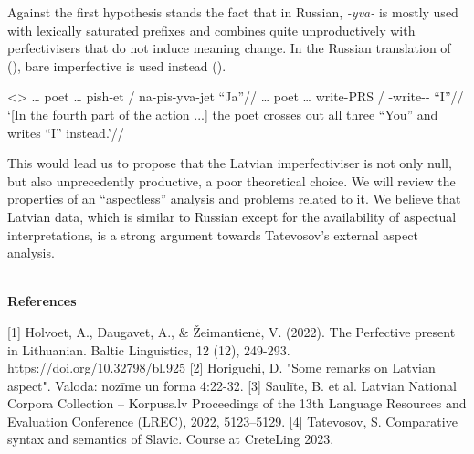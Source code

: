 \documentclass[a4paper, 12pt]{article}
\begin{document}
\begin{sloppypar}
Against the first hypothesis stands the fact that in Russian, \textit{-yva-} is mostly used with lexically saturated prefixes and combines quite unproductively with perfectivisers that do not induce meaning change. In the Russian
translation of (), bare imperfective is used instead (\nextx).

\ex<>
    \begingl
        \gla … poet … pish-et / \ljudge*na-pis-yva-jet “Ja”//
        \glb … poet … write-PRS / \Pfv-write-\Ipfv-\Prs{} “I”//
        \glft ‘[In the fourth part of the action ...] the poet crosses out all three “You” and writes “I” instead.’//
    \endgl
\xe

This would lead us to propose that the Latvian imperfectiviser is not only null, but also
unprecedently productive, a poor theoretical choice. We will review the properties
of an “aspectless” analysis and problems related to it. We believe that Latvian data, which is
similar to Russian except for the availability of aspectual interpretations, is a strong argument
towards Tatevosov’s external aspect analysis.
\\~

\textbf{References}

[1] Holvoet, A., Daugavet, A., \& Žeimantienė, V. (2022). The Perfective present in
Lithuanian. Baltic Linguistics, 12 (12), 249-293. https://doi.org/10.32798/bl.925
[2] Horiguchi, D. "Some remarks on Latvian aspect". Valoda: nozīme un forma 4:22-32.
[3] Saulīte, B. et al. Latvian National Corpora Collection – Korpuss.lv
Proceedings of the 13th Language Resources and Evaluation Conference (LREC), 2022,
5123–5129.
[4] Tatevosov, S. Comparative syntax and semantics of Slavic. Course at CreteLing 2023.

\end{sloppypar}
\end{document}
